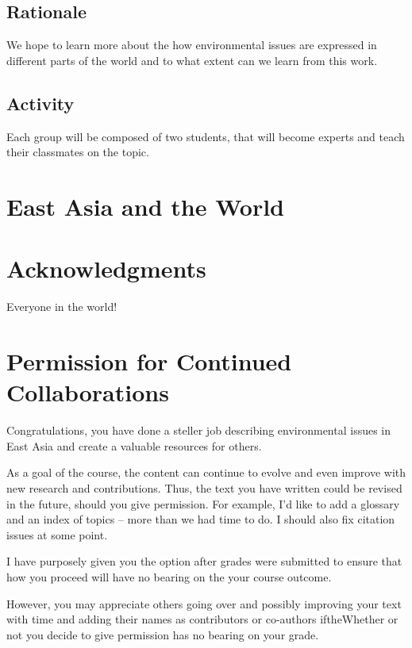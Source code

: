 \documentclass{book}\usepackage{knitr}
\begin{document}
\subsection*{Rationale}

We hope to learn more about the how environmental issues are expressed in different parts of the world and to what extent can we learn from this work. 

\subsection*{Activity}

Each group will be composed of two students, that will become experts and teach their classmates on the topic. 

\section*{East Asia and the World}







\section*{Acknowledgments}

Everyone in the world!




\newpage

\section*{Permission for Continued Collaborations}

Congratulations, you have done a steller job describing environmental issues in East Asia and create a valuable resources for others. 

As a goal of the course, the content can continue to evolve and even improve with new research and contributions. Thus, the text you have written could be revised in the future, should you give permission. For example, I'd like to add a glossary and an index of topics -- more than we had time to do. I should also fix citation issues at some point. 

I have purposely given you the option after grades were submitted to ensure that how you proceed will have no bearing on the your course outcome.

However, you may appreciate others going over and possibly improving your text with time and adding their names as contributors or co-authors iftheWhether or not you decide to give permission has no bearing on your grade.
\end{document}
